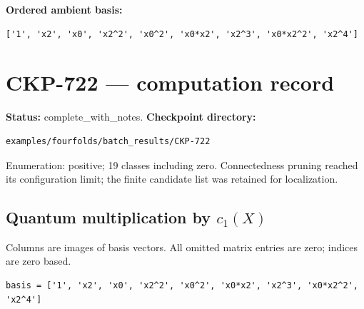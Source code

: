 \documentclass[10pt,a4paper]{article}
\begin{document}
\textbf{Ordered ambient basis:}
\begin{lstlisting}
['1', 'x2', 'x0', 'x2^2', 'x0^2', 'x0*x2', 'x2^3', 'x0*x2^2', 'x2^4']
\end{lstlisting}

\clearpage\section*{CKP-722 --- computation record}
\textbf{Status:} complete\_with\_notes.
\textbf{Checkpoint directory:}
\begin{lstlisting}
examples/fourfolds/batch_results/CKP-722
\end{lstlisting}

Enumeration: positive; 19 classes including zero.
Connectedness pruning reached its configuration limit; the finite candidate list was retained for localization.
\subsection*{Quantum multiplication by $c_1(X)$}
Columns are images of basis vectors. All omitted matrix entries are zero; indices are zero based.

\begin{lstlisting}
basis = ['1', 'x2', 'x0', 'x2^2', 'x0^2', 'x0*x2', 'x2^3', 'x0*x2^2', 'x2^4']
\end{lstlisting}
\end{document}
